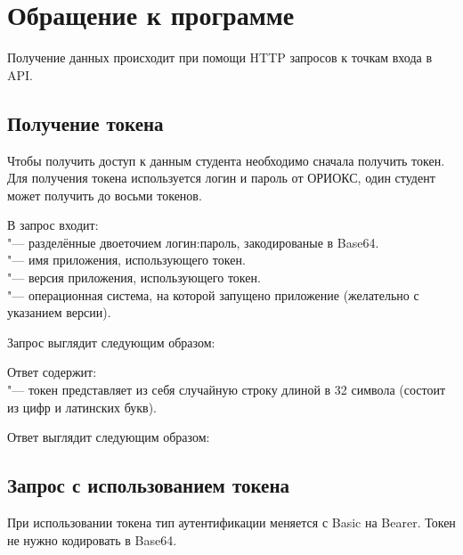 \chapter{Обращение к программе}
\label{ch:usage}

Получение данных происходит при помощи HTTP запросов к точкам входа в API\@.

\section{Получение токена}
\label{sec:token}
Чтобы получить доступ к данным студента необходимо сначала получить токен.
Для получения токена используется логин и пароль от ОРИОКС, один студент может получить до восьми токенов.

В запрос входит:\\
 "--- разделённые двоеточием логин:пароль, закодированые в Base64.\\
 "--- имя приложения, использующего токен.\\
 "--- версия приложения, использующего токен.\\
 "--- операционная система, на которой запущено приложение (желательно с указанием версии).

Запрос выглядит следующим образом:
\begin{listing}[H]
\end{listing}
\vspace{-0.75cm}

Ответ содержит:\\
 "--- токен представляет из себя случайную строку длиной в 32 символа (состоит из цифр и латинских букв).

Ответ выглядит следующим образом:
\begin{listing}[H]
\end{listing}
\vspace{-0.75cm}

\section{Запрос с использованием токена}
\label{sec:request}
При использовании токена тип аутентификации меняется с Basic на Bearer.
Токен не нужно кодировать в Base64.

\begin{listing}[H]
\end{listing}
\vspace{-0.75cm}


